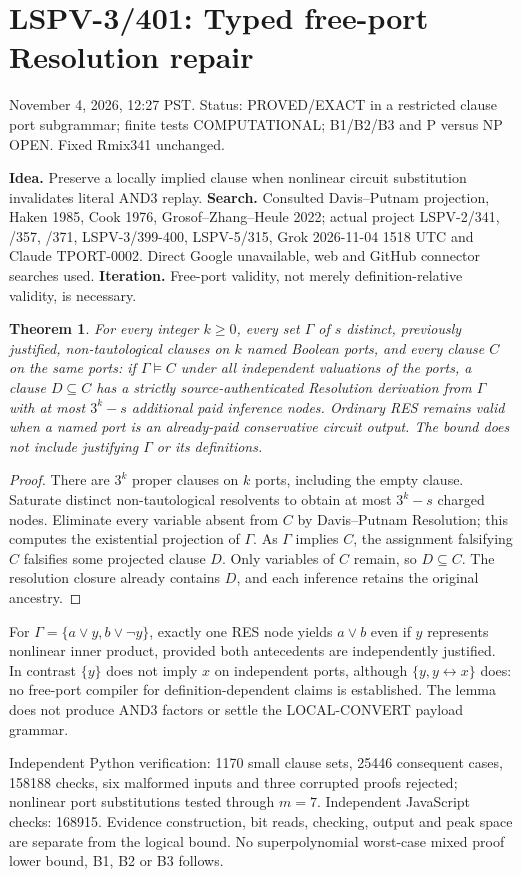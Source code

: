 \documentclass{article}
\newtheorem{theorem}{Theorem}
\begin{document}
\section*{LSPV-3/401: Typed free-port Resolution repair}
November 4, 2026, 12:27 PST. Status: PROVED/EXACT in a restricted clause port subgrammar; finite tests COMPUTATIONAL; B1/B2/B3 and P versus NP OPEN. Fixed Rmix341 unchanged.

\textbf{Idea.} Preserve a locally implied clause when nonlinear circuit substitution invalidates literal AND3 replay. \textbf{Search.} Consulted Davis--Putnam projection, Haken 1985, Cook 1976, Grosof--Zhang--Heule 2022; actual project LSPV-2/341, /357, /371, LSPV-3/399-400, LSPV-5/315, Grok 2026-11-04 1518 UTC and Claude TPORT-0002. Direct Google unavailable, web and GitHub connector searches used. \textbf{Iteration.} Free-port validity, not merely definition-relative validity, is necessary.

\begin{theorem}
For every integer $k\ge0$, every set $\Gamma$ of $s$ distinct, previously justified, non-tautological clauses on $k$ named Boolean ports, and every clause $C$ on the same ports: if $\Gamma\models C$ under all independent valuations of the ports, a clause $D\subseteq C$ has a strictly source-authenticated Resolution derivation from $\Gamma$ with at most $3^k-s$ additional paid inference nodes. Ordinary RES remains valid when a named port is an already-paid conservative circuit output. The bound does not include justifying $\Gamma$ or its definitions.
\end{theorem}
\begin{proof}
There are $3^k$ proper clauses on $k$ ports, including the empty clause. Saturate distinct non-tautological resolvents to obtain at most $3^k-s$ charged nodes. Eliminate every variable absent from $C$ by Davis--Putnam Resolution; this computes the existential projection of $\Gamma$. As $\Gamma$ implies $C$, the assignment falsifying $C$ falsifies some projected clause $D$. Only variables of $C$ remain, so $D\subseteq C$. The resolution closure already contains $D$, and each inference retains the original ancestry.
\end{proof}
For $\Gamma=\{a\lor y,b\lor\neg y\}$, exactly one RES node yields $a\lor b$ even if $y$ represents nonlinear inner product, provided both antecedents are independently justified. In contrast $\{y\}$ does not imply $x$ on independent ports, although $\{y,y\leftrightarrow x\}$ does: no free-port compiler for definition-dependent claims is established. The lemma does not produce AND3 factors or settle the LOCAL-CONVERT payload grammar.

Independent Python verification: 1170 small clause sets, 25446 consequent cases, 158188 checks, six malformed inputs and three corrupted proofs rejected; nonlinear port substitutions tested through $m=7$. Independent JavaScript checks: 168915. Evidence construction, bit reads, checking, output and peak space are separate from the logical bound. No superpolynomial worst-case mixed proof lower bound, B1, B2 or B3 follows.
\end{document}
